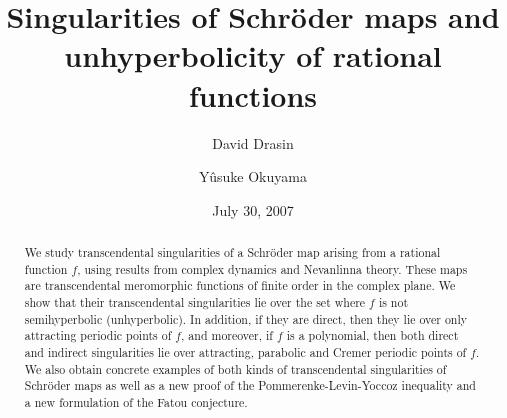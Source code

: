 \documentclass[a4paper,12pt]{amsart}
\theoremstyle{plain}
\theoremstyle{definition}
\theoremstyle{remark}
\numberwithin{equation}{section}
\begin{document}
\title[singularities and unhyperbolicity]{Singularities of Schr\"oder maps and unhyperbolicity of rational functions}

\author[David Drasin]{David Drasin}
\address{Department of Mathematics, Purdue University, West Lafayette, IN 47907, USA}

\author[Y\^usuke Okuyama]{Y\^usuke Okuyama}
\address{Department of Comprehensive Sciences,
Graduate School of Science and Technology,
Kyoto Institute of Technology,
Kyoto 606-8585, JAPAN}




\date{July 30, 2007}

\begin{abstract}
 We study transcendental singularities of
 a Schr\"oder map arising from a rational function $f$,
 using results from complex dynamics and Nevanlinna theory.
 These maps are transcendental meromorphic functions
 of finite order in the complex plane.
 We show that their transcendental singularities
 lie over the set where $f$ is not semihyperbolic (unhyperbolic). In addition,
 if they are direct, then they lie over only attracting periodic points of $f$, 
 and moreover, if $f$ is a polynomial, 
 then both direct and indirect singularities lie over
 attracting, parabolic and Cremer periodic points of $f$.
 We also obtain concrete examples of
 both kinds of transcendental singularities of Schr\"oder maps
 as well as a new proof of the Pommerenke-Levin-Yoccoz inequality 
 and a new formulation of the Fatou conjecture.
\end{abstract}

\maketitle
\end{document}
